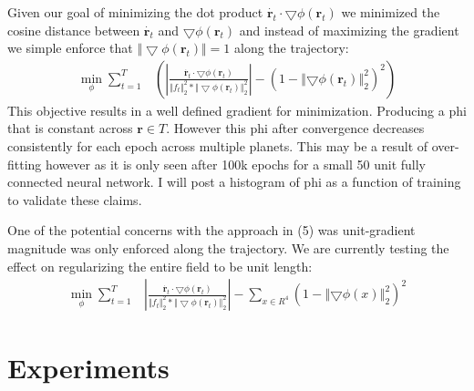 \documentclass[10pt,letterpaper]{report}
\begin{document}
Given our goal of minimizing the dot product $\dot{\pmb{r}_t} \cdot \bigtriangledown \phi \left( \pmb{r}_t \right)$ we minimized the cosine distance between $\dot{\pmb{r}_t}$ and $ \bigtriangledown \phi \left( \pmb{r}_t \right)$ and instead of maximizing the gradient we simple enforce that $\Vert \bigtriangledown\phi({\pmb r}_t) \Vert = 1$ along the trajectory:
\begin{align}
\min_{\phi} \sum^{T}_{t = 1} &  
\left( \left\vert
	\frac{\dot{\pmb{r}_t} \cdot \bigtriangledown \phi \left( \pmb{r}_t \right)}{{\Vert f_t \Vert}^2_2 * {\Vert \bigtriangledown \phi (\pmb{r}_t) \Vert}^2_2}
 \right \vert
 - \left( 1-\left\Vert \bigtriangledown \phi \left( \pmb{r}_t \right) \right\Vert^2_2 \right)^2 \right)
\end{align}
This objective results in a well defined gradient for minimization. Producing a phi that is constant across $ {\pmb r} \in T$. However this phi after convergence decreases consistently for each epoch across multiple planets. This may be a result of over-fitting however as it is only seen after 100k epochs for a small 50 unit fully connected neural network. I will post a histogram of phi as a function of training to validate these claims.



One of the potential concerns with the approach in (5) was unit-gradient magnitude was only enforced along the trajectory. We are currently testing the effect on regularizing the entire field to be unit length:
\begin{align}
\min_{\phi} \sum^{T}_{t = 1} &  
	\left\vert
	\frac{\dot{\pmb{r}_t} \cdot \bigtriangledown \phi \left( \pmb{r}_t \right)}{{\Vert f_t \Vert}^2_2 * {\Vert \bigtriangledown \phi (\pmb{r}_t) \Vert}^2_2}
	\right\vert
 -
\sum_{x \in R^4}\left( 1-\left\Vert \bigtriangledown \phi ( x ) \right\Vert^2_2 \right)^2
\end{align}


\section{Experiments}
\end{document}
